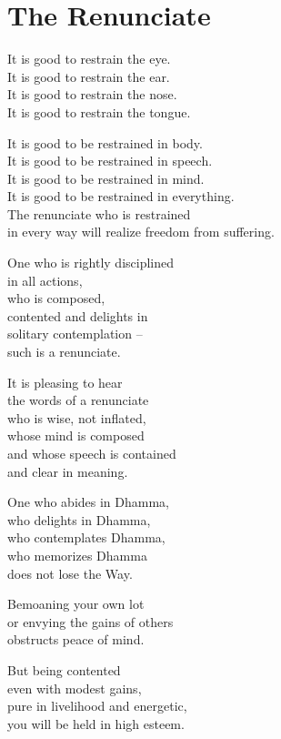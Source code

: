 
\chapter{The Renunciate}


It is good to restrain the eye.\\
It is good to restrain the ear.\\
It is good to restrain the nose.\\
It is good to restrain the tongue.


It is good to be restrained in body.\\
It is good to be restrained in speech.\\
It is good to be restrained in mind.\\
It is good to be restrained in everything.\\
The renunciate who is restrained\\
in every way will realize freedom from suffering.


One who is rightly disciplined\\
in all actions,\\
who is composed,\\
contented and delights in\\
solitary contemplation --\\
such is a renunciate.


It is pleasing to hear\\
the words of a renunciate\\
who is wise, not inflated,\\
whose mind is composed\\
and whose speech is contained\\
and clear in meaning.


One who abides in Dhamma,\\
who delights in Dhamma,\\
who contemplates Dhamma,\\
who memorizes Dhamma\\
does not lose the Way.


Bemoaning your own lot\\
or envying the gains of others\\
obstructs peace of mind.


But being contented\\
even with modest gains,\\
pure in livelihood and energetic,\\
you will be held in high esteem.


